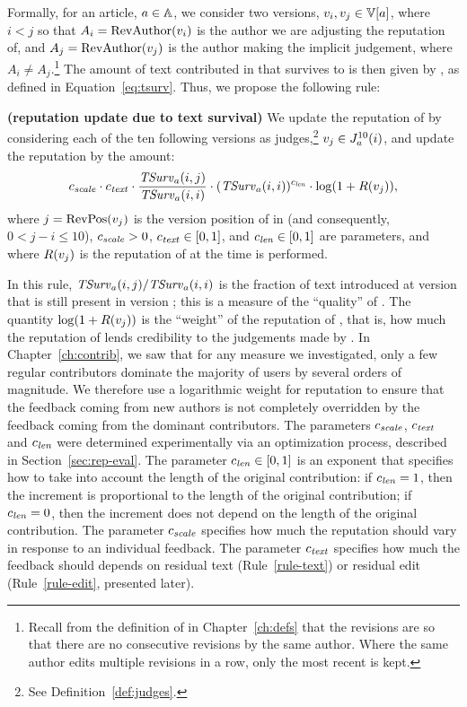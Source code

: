 Formally, for an article, $a \in \mathbb{A}$,
we consider two versions, $\version{i}, \version{j} \in \versions{a}$,
where $i < j$ so that $A_i = \mathrm{RevAuthor}(v_{i})$ is the author we are
adjusting the reputation of, and $A_j = \mathrm{RevAuthor}(v_{j})$ is the author
making the implicit judgement, where $A_i \not = A_j$.\footnote{Recall
from the definition of \versions{\article{}} in Chapter~\ref{ch:defs}
that the revisions are  so that there are no consecutive
revisions by the same author.
Where the same author edits multiple revisions in a row, only the
most recent is kept.}
The amount of text contributed in  that survives
to  is then given by , as defined in
Equation~\ref{eq:tsurv}.
Thus, we propose the following rule:

\begin{regola}
\textbf{(reputation update due to text survival)}
\label{rule-text}
  We update the reputation of  by considering
  each of the ten following versions as judges,\footnote{See
  Definition~\ref{def:judges}.}
  $v_j \in J_{a}^{10}(i)$, and update the reputation by the amount:
  \[
    {c_{{\text{\textit{scale}}}}} \cdot {c_{{\text{\textit{text}}}}} \cdot \frac{\mathit{TSurv}_{a}(i,j)}{\mathit{TSurv}_{a}(i,i)}
    \cdot (\mathit{TSurv}_{a}(i,i))^{c_{{\text{\textit{len}}}}} \cdot \log(1 + R(v_{j})),
  \]
  where $j = \mathrm{RevPos}(v_{j})$ is the version position of 
  in  (and consequently, $0 < j - i \le 10$),
  ${c_{{\text{\textit{scale}}}}} > 0$, ${c_{{\text{\textit{text}}}}} \in [0,1]$, and ${c_{{\text{\textit{len}}}}} \in
  [0,1]$ are parameters, and where $R(v_{j})$ is the reputation of
   at the time  is performed.
\end{regola}

\noindent
In this rule, $\mathit{TSurv}_{a}(i,j) / \mathit{TSurv}_{a}(i,i)$ is the fraction of text
introduced at version  that is still present in version ;
this is a measure of the ``quality'' of .
The quantity $\log(1 + R(v_{j}))$ is the ``weight'' of the
reputation of ,
that is, how much the reputation of  lends
credibility to the judgements made by .
In Chapter~\ref{ch:contrib}, we saw that for any measure we investigated,
only a few regular contributors dominate the majority of users by
several orders of magnitude.
We therefore use a logarithmic weight for reputation
to ensure that the feedback coming from new authors is not completely
overridden by the feedback coming from the dominant contributors.
The parameters ${c_{{\text{\textit{scale}}}}}$, ${c_{{\text{\textit{text}}}}}$ and ${c_{{\text{\textit{len}}}}}$ were
determined experimentally via an optimization process, described
in Section~\ref{sec:rep-eval}.
The parameter ${c_{{\text{\textit{len}}}}} \in [0,1]$ is an exponent that specifies how
to take into account the length of the original contribution: if
${c_{{\text{\textit{len}}}}} = 1$, then the increment is proportional to the length of
the original contribution; if ${c_{{\text{\textit{len}}}}} = 0$, then the increment
does not depend on the length of the original contribution.
The parameter ${c_{{\text{\textit{scale}}}}}$ specifies how much the reputation should
vary in response to an individual feedback.
The parameter ${c_{{\text{\textit{text}}}}}$ specifies how much the feedback should
depends on residual text (Rule~\ref{rule-text}) or residual edit
(Rule~\ref{rule-edit}, presented later).

